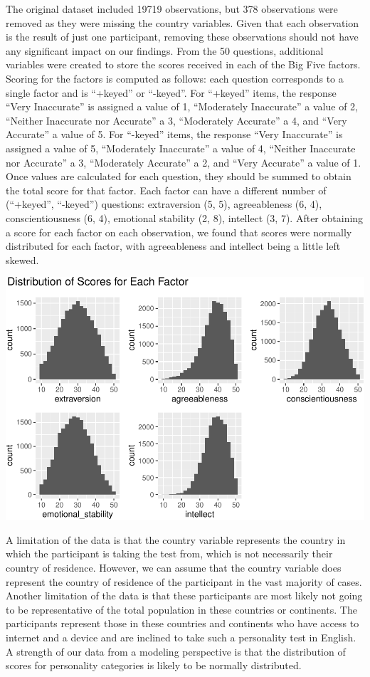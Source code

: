 \documentclass[
]{article}
\begin{document}
The original dataset included 19719 observations, but 378 observations
were removed as they were missing the country variables. Given that each
observation is the result of just one participant, removing these
observations should not have any significant impact on our findings.
From the 50 questions, additional variables were created to store the
scores received in each of the Big Five factors. Scoring for the factors
is computed as follows: each question corresponds to a single factor and
is ``+keyed'' or ``-keyed''. For ``+keyed'' items, the response ``Very
Inaccurate'' is assigned a value of 1, ``Moderately Inaccurate'' a value
of 2, ``Neither Inaccurate nor Accurate'' a 3, ``Moderately Accurate'' a
4, and ``Very Accurate'' a value of 5. For ``-keyed'' items, the
response ``Very Inaccurate'' is assigned a value of 5, ``Moderately
Inaccurate'' a value of 4, ``Neither Inaccurate nor Accurate'' a 3,
``Moderately Accurate'' a 2, and ``Very Accurate'' a value of 1. Once
values are calculated for each question, they should be summed to obtain
the total score for that factor. Each factor can have a different number
of (``+keyed'', ``-keyed'') questions: extraversion (5, 5),
agreeableness (6, 4), conscientiousness (6, 4), emotional stability (2,
8), intellect (3, 7). After obtaining a score for each factor on each
observation, we found that scores were normally distributed for each
factor, with agreeableness and intellect being a little left skewed.

\includegraphics{project_files/figure-latex/unnamed-chunk-6-1.pdf}

A limitation of the data is that the country variable represents the
country in which the participant is taking the test from, which is not
necessarily their country of residence. However, we can assume that the
country variable does represent the country of residence of the
participant in the vast majority of cases. Another limitation of the
data is that these participants are most likely not going to be
representative of the total population in these countries or continents.
The participants represent those in these countries and continents who
have access to internet and a device and are inclined to take such a
personality test in English. A strength of our data from a modeling
perspective is that the distribution of scores for personality
categories is likely to be normally distributed.
\end{document}
